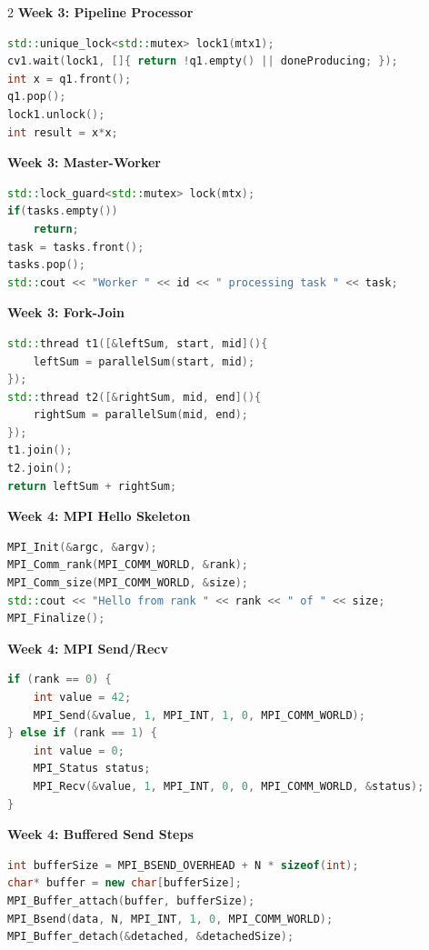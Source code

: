 \documentclass[9pt]{extarticle}
\begin{document}
\begin{multicols}{2}
\textbf{Week 3: Pipeline Processor}\par
\begin{lstlisting}[language=C++]
std::unique_lock<std::mutex> lock1(mtx1);
cv1.wait(lock1, []{ return !q1.empty() || doneProducing; });
int x = q1.front();
q1.pop();
lock1.unlock();
int result = x*x;
\end{lstlisting}

\textbf{Week 3: Master-Worker}\par
\begin{lstlisting}[language=C++]
std::lock_guard<std::mutex> lock(mtx);
if(tasks.empty())
    return;
task = tasks.front();
tasks.pop();
std::cout << "Worker " << id << " processing task " << task;
\end{lstlisting}

\textbf{Week 3: Fork-Join}\par
\begin{lstlisting}[language=C++]
std::thread t1([&leftSum, start, mid](){
    leftSum = parallelSum(start, mid);
});
std::thread t2([&rightSum, mid, end](){
    rightSum = parallelSum(mid, end);
});
t1.join();
t2.join();
return leftSum + rightSum;
\end{lstlisting}

\textbf{Week 4: MPI Hello Skeleton}\par
\begin{lstlisting}[language=C++]
MPI_Init(&argc, &argv);
MPI_Comm_rank(MPI_COMM_WORLD, &rank);
MPI_Comm_size(MPI_COMM_WORLD, &size);
std::cout << "Hello from rank " << rank << " of " << size;
MPI_Finalize();
\end{lstlisting}

\textbf{Week 4: MPI Send/Recv}\par
\begin{lstlisting}[language=C++]
if (rank == 0) {
    int value = 42;
    MPI_Send(&value, 1, MPI_INT, 1, 0, MPI_COMM_WORLD);
} else if (rank == 1) {
    int value = 0;
    MPI_Status status;
    MPI_Recv(&value, 1, MPI_INT, 0, 0, MPI_COMM_WORLD, &status);
}
\end{lstlisting}

\textbf{Week 4: Buffered Send Steps}\par
\begin{lstlisting}[language=C++]
int bufferSize = MPI_BSEND_OVERHEAD + N * sizeof(int);
char* buffer = new char[bufferSize];
MPI_Buffer_attach(buffer, bufferSize);
MPI_Bsend(data, N, MPI_INT, 1, 0, MPI_COMM_WORLD);
MPI_Buffer_detach(&detached, &detachedSize);
\end{lstlisting}


\end{multicols}
\end{document}
